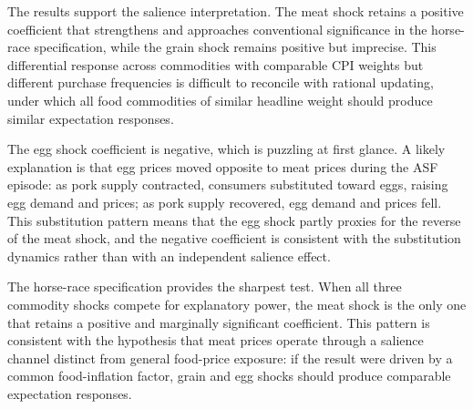 The results support the salience interpretation.
The meat shock retains a positive coefficient that
strengthens and approaches conventional significance in
the horse-race specification, while the grain shock remains
positive but imprecise.
This differential response across commodities with comparable
CPI weights but different purchase frequencies is difficult to
reconcile with rational updating, under which all food
commodities of similar headline weight should produce
similar expectation responses.

The egg shock coefficient is negative, which is puzzling
at first glance.
A likely explanation is that egg prices moved opposite to
meat prices during the ASF episode: as pork supply contracted,
consumers substituted toward eggs, raising egg demand and
prices; as pork supply recovered, egg demand and prices fell.
This substitution pattern means that the egg shock partly
proxies for the reverse of the meat shock, and the negative
coefficient is consistent with the substitution dynamics
rather than with an independent salience effect.

The horse-race specification provides the sharpest test.
When all three commodity shocks compete for explanatory power,
the meat shock is the only one that retains a positive and
marginally significant coefficient.
This pattern is consistent with the hypothesis that meat
prices operate through a salience channel distinct from
general food-price exposure: if the result were driven by
a common food-inflation factor, grain and egg shocks should
produce comparable expectation responses.
